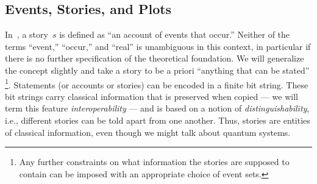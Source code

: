 \documentclass[aps,pra,12pt]{revtex4-2}
\theoremstyle{definition}
\theoremstyle{remark}
\begin{document}
\subsection{Events, Stories, and Plots}
\label{ssec:stories_events_plots}
\noindent
In~\cite{FrRen}, a story~$s$ is defined as ``an account of events that occur.''
Neither of the terms ``event,'' ``occur,'' and ``real'' is unambiguous in this context, 
in particular if there is no further specification of the theoretical foundation.
We will generalize the concept slightly and take a story to be a priori ``anything that can be stated'' \footnote{Any further constraints on what information the stories are supposed to contain can be imposed with an appropriate choice of event sets.}.
Statements (or accounts or stories) can be encoded in a finite bit string.
These bit strings carry classical information that is preserved when copied --- we will term this feature \emph{interoperability} --- and is based on a notion of \emph{distinguishability}, i.e., different stories can be told apart from one another.
Thus, stories are entities of classical information, even though we might talk about quantum systems.
\end{document}
